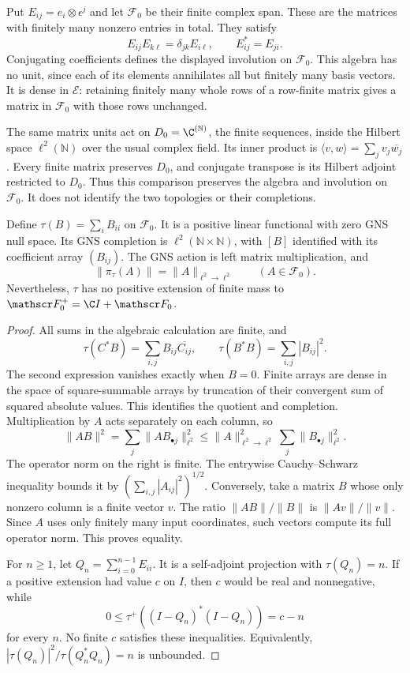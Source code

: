 Put $E_{ij}=e_i\otimes\epsilon^j$ and let $\mathscr F_0$ be their
finite complex span.  These are the matrices with finitely many nonzero
entries in total.  They satisfy
\[
 E_{ij}E_{k\ell}=\delta_{jk}E_{i\ell},\qquad
 E_{ij}^*=E_{ji}.
\]
Conjugating coefficients defines the displayed involution on
$\mathscr F_0$.  This algebra has no unit, since each of its elements
annihilates all but finitely many basis vectors.
It is dense in $\mathscr E$: retaining finitely many whole rows of a
row-finite matrix gives a matrix in $\mathscr F_0$ with those rows unchanged.

The same matrix units act on $D_0=\C^{(\mathbb N)}$, the finite sequences,
inside the Hilbert space $\ell^2(\mathbb N)$ over the usual complex field.
Its inner product is $\langle v,w\rangle=\sum_jv_j\overline{w_j}$.
Every finite matrix preserves $D_0$, and conjugate transpose is its
Hilbert adjoint restricted to $D_0$.  Thus this comparison preserves the
algebra and involution on $\mathscr F_0$.  It does not identify the two
topologies or their completions.

\begin{proposition}
\label{prop:weil-matrix-trace}
Define $\tau(B)=\sum_i B_{ii}$ on $\mathscr F_0$.
It is a positive linear functional with zero GNS null space.
Its GNS completion is $\ell^2(\mathbb N\times\mathbb N)$, with $[B]$
identified with its coefficient array $(B_{ij})$.
The GNS action is left matrix multiplication, and
\[
 \|\pi_\tau(A)\|=\|A\|_{\ell^2\to\ell^2}
 \qquad(A\in\mathscr F_0).
\]
Nevertheless, $\tau$ has no positive extension of finite mass to
$\mathscr F_0^+=\C I+\mathscr F_0$.
\end{proposition}
\begin{proof}
All sums in the algebraic calculation are finite, and
\[
 \tau(C^*B)=\sum_{i,j}B_{ij}\overline{C_{ij}},\qquad
 \tau(B^*B)=\sum_{i,j}|B_{ij}|^2.
\]
The second expression vanishes exactly when $B=0$.
Finite arrays are dense in the space of square-summable arrays by
truncation of their convergent sum of squared absolute values.
This identifies the quotient and completion.
Multiplication by $A$ acts separately on each column, so
\[
 \|AB\|^2=\sum_j\|A B_{\bullet j}\|_{\ell^2}^2
       \leq\|A\|_{\ell^2\to\ell^2}^2\sum_j\|B_{\bullet j}\|_{\ell^2}^2.
\]
The operator norm on the right is finite.  The entrywise
Cauchy--Schwarz inequality bounds it by
$(\sum_{i,j}|A_{ij}|^2)^{1/2}$.
Conversely, take a matrix $B$ whose only nonzero column is a finite
vector $v$.  The ratio $\|AB\|/\|B\|$ is $\|Av\|/\|v\|$.
Since $A$ uses only finitely many input coordinates, such vectors
compute its full operator norm.  This proves equality.

For $n\geq1$, let $Q_n=\sum_{i=0}^{n-1}E_{ii}$.
It is a self-adjoint projection with $\tau(Q_n)=n$.
If a positive extension had value $c$ on $I$, then $c$ would be real
and nonnegative, while
\[
 0\leq\tau^+((I-Q_n)^*(I-Q_n))=c-n
\]
for every $n$.  No finite $c$ satisfies these inequalities.
Equivalently,
$|\tau(Q_n)|^2/\tau(Q_n^*Q_n)=n$ is unbounded.
\end{proof}

